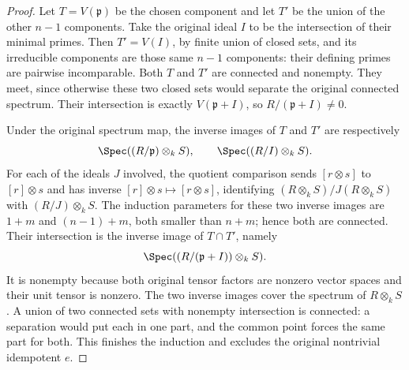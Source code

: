 \begin{proof}
Let $T=V(\mathfrak p)$ be the
chosen component and let $T'$
be the union of the other
$n-1$ components. Take the
original ideal $I$ to be the
intersection of their minimal
primes. Then $T'=V(I)$, by
finite union of closed sets,
and its irreducible components
are those same $n-1$ components:
their defining primes are
pairwise incomparable. Both
$T$ and $T'$ are connected
and nonempty. They meet,
since otherwise these two
closed sets would separate
the original connected spectrum.
Their intersection is exactly
$V(\mathfrak p+I)$, so
$R/(\mathfrak p+I)\neq0$.

Under the original spectrum map,
the inverse images of $T$ and
$T'$ are respectively
$$
\Spec((R/\mathfrak p)\otimes_k S),\qquad
\Spec((R/I)\otimes_k S).
$$
For each of the ideals $J$
involved, the quotient comparison
sends $[r\otimes s]$ to
$[r]\otimes s$ and has inverse
$[r]\otimes s\mapsto[r\otimes s]$,
identifying $(R\otimes_k S)/J(R\otimes_k S)$
with $(R/J)\otimes_k S$.
The induction parameters for
these two inverse images are
$1+m$ and $(n-1)+m$, both
smaller than $n+m$; hence
both are connected. Their
intersection is the inverse
image of $T\cap T'$, namely
$$
\Spec((R/(\mathfrak p+I))\otimes_k S).
$$
It is nonempty because both
original tensor factors are
nonzero vector spaces and
their unit tensor is nonzero.
The two inverse images cover
the spectrum of $R\otimes_k S$.
A union of two connected sets
with nonempty intersection is
connected: a separation would
put each in one part, and
the common point forces the
same part for both.
This finishes the induction
and excludes the original
nontrivial idempotent $e$.
\end{proof}